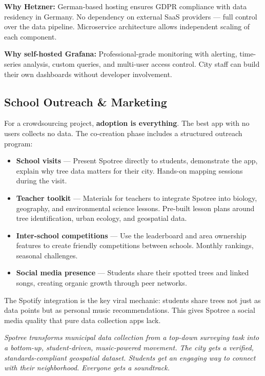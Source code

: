\documentclass[11pt,a4paper]{article}
\begin{document}
\textbf{Why Hetzner:} German-based hosting ensures GDPR compliance with data residency in Germany. No dependency on external SaaS providers --- full control over the data pipeline. Microservice architecture allows independent scaling of each component.

\textbf{Why self-hosted Grafana:} Professional-grade monitoring with alerting, time-series analysis, custom queries, and multi-user access control. City staff can build their own dashboards without developer involvement.

\subsection{School Outreach \& Marketing}

For a crowdsourcing project, \textbf{adoption is everything}. The best app with no users collects no data. The co-creation phase includes a structured outreach program:

\begin{itemize}[nosep]
  \item \textbf{School visits} --- Present Spotree directly to students, demonstrate the app, explain why tree data matters for their city. Hands-on mapping sessions during the visit.
  \item \textbf{Teacher toolkit} --- Materials for teachers to integrate Spotree into biology, geography, and environmental science lessons. Pre-built lesson plans around tree identification, urban ecology, and geospatial data.
  \item \textbf{Inter-school competitions} --- Use the leaderboard and area ownership features to create friendly competitions between schools. Monthly rankings, seasonal challenges.
  \item \textbf{Social media presence} --- Students share their spotted trees and linked songs, creating organic growth through peer networks.
\end{itemize}

The Spotify integration is the key viral mechanic: students share trees not just as data points but as personal music recommendations. This gives Spotree a social media quality that pure data collection apps lack.

\vspace{1cm}
\begin{center}
\end{center}

\begin{center}
\textit{\color{spotgray}Spotree transforms municipal data collection from a top-down surveying task into a bottom-up, student-driven, music-powered movement. The city gets a verified, standards-compliant geospatial dataset. Students get an engaging way to connect with their neighborhood. Everyone gets a soundtrack.}
\end{center}
\end{document}
